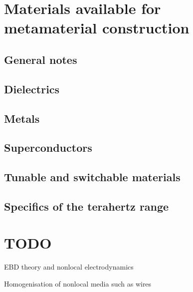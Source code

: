 

\section{Materials available for metamaterial construction}
\subsection{General notes}
\subsection{Dielectrics}
\subsection{Metals}
\subsection{Superconductors}
\subsection{Tunable and switchable materials}
\subsection{Specifics of the terahertz range}


\section{TODO}

EBD theory and nonlocal electrodynamics 
\cite{krowne2007book}
\cite{landau1984electrodynamics}
\cite{agranovich2006spatial}
\cite{mikki2009electromagnetic}
\cite{vinogradov2002form}
\cite{golubkov1995boundary}
\cite{agranovich2004linear}
\cite{agranovich1962crystal}

Homogenisation of nonlocal media such as wires 
\cite{capolino2009theory}
\cite{silveirinha2007metamaterial}
\cite{belov2003strong}
\cite{belov2002dispersion}
\cite{lindell2001bw}
\cite{silveirinha2005homogenization}

